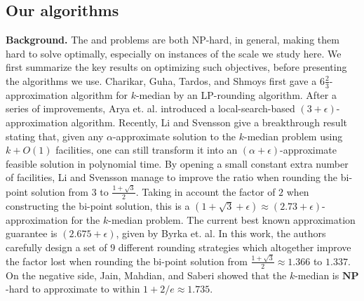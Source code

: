 

\subsection*{Our algorithms}

\noindent
\textbf{Background.}
The \probstatic{} and \probinc{} problems are both NP-hard, in general, making them hard to solve optimally,
especially on instances of the scale we study here.  We first summarize the key results on optimizing
such objectives, before presenting the algorithms we use.
Charikar, Guha, Tardos, and Shmoys \cite{charikar_kmed} first gave a $6\frac{2}{3}$-approximation algorithm for $k$-median by an LP-rounding algorithm. After a series of improvements, Arya et. al. \cite{arya} introduced a local-search-based $(3+\epsilon)$-approximation algorithm. Recently, Li and Svensson \cite{li_svensson} give a breakthrough result stating that, given any $\alpha$-approximate solution to the $k$-median problem using $k+O(1)$ facilities, one can still transform it into an $(\alpha+\epsilon)$-approximate feasible solution in polynomial time. By opening a small constant extra number of facilities, Li and Svensson manage to improve the ratio when rounding the bi-point solution from $3$ to $\frac{1+\sqrt{3}}{2}$. Taking in account the factor of $2$ when constructing the bi-point solution, this is a $(1+\sqrt{3}+\epsilon) \approx (2.73+\epsilon)$-approximation for the $k$-median problem. The current best known approximation guarantee is $(2.675+\epsilon)$, given by Byrka et. al. \cite{byrka_kmed} In this work, the authors carefully design a set of $9$ different rounding strategies which altogether improve the factor lost when rounding the bi-point solution from $\frac{1+\sqrt{3}}{2} \approx 1.366$ to $1.337$. On the negative side, Jain, Mahdian, and Saberi \cite{jms} showed that the $k$-median is $\mathbf{NP}$-hard to approximate to within $1+2/e \approx 1.735$.

